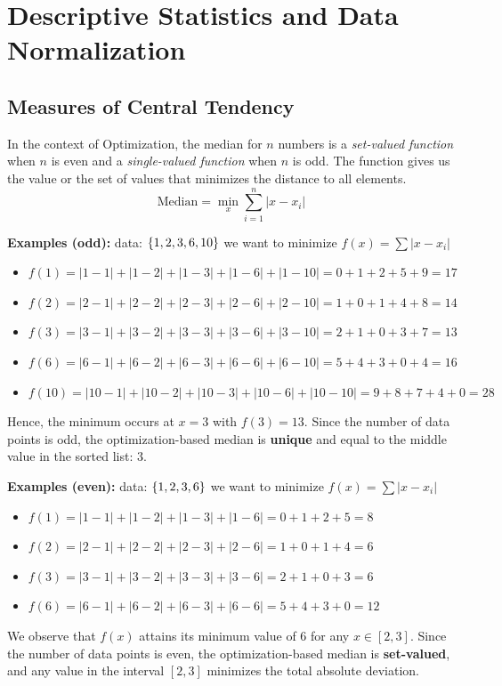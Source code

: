 \documentclass{article}
\begin{document}

\newpage
\section{Descriptive Statistics and Data Normalization}
\subsection*{Measures of Central Tendency}


In the context of Optimization, the median for $n$ numbers is a \textit{set-valued function} when $n$ is even and a \textit{single-valued function} when $n$ is odd. The function gives us the value or the set of values that minimizes the distance to all elements.
\[
\text{Median} = \displaystyle \min_{x} \sum_{i=1}^n | x-x_i |
\]

\textbf{Examples (odd):}
data: $\{1,2,3,6,10\}$
we want to minimize $f(x)= \sum | x - x_i |$
\begin{itemize}
    \item $f(1) = |1-1| + |1-2| + |1-3| + |1-6| + |1-10| = 0 + 1 + 2 + 5 + 9 = 17$
    \item $f(2) = |2-1| + |2-2| + |2-3| + |2-6| + |2-10| = 1 + 0 + 1 + 4 + 8 = 14$
    \item $f(3) = |3-1| + |3-2| + |3-3| + |3-6| + |3-10| = 2 + 1 + 0 + 3 + 7 = 13$
    \item $f(6) = |6-1| + |6-2| + |6-3| + |6-6| + |6-10| = 5 + 4 + 3 + 0 + 4 = 16$
    \item $f(10) = |10-1| + |10-2| + |10-3| + |10-6| + |10-10| = 9 + 8 + 7 + 4 + 0 = 28$
\end{itemize}
Hence, the minimum occurs at $x = 3$ with $f(3) = 13$. Since the number of data points is odd, the optimization-based median is \textbf{unique} and equal to the middle value in the sorted list: $\boxed{3}$.

\textbf{Examples (even):}
data: $\{1,2,3,6\}$
we want to minimize $f(x)= \sum | x - x_i |$
\begin{itemize}
    \item $f(1) = |1-1| + |1-2| + |1-3| + |1-6| = 0 + 1 + 2 + 5 = 8$
    \item $f(2) = |2-1| + |2-2| + |2-3| + |2-6| = 1 + 0 + 1 + 4 = 6$
    \item $f(3) = |3-1| + |3-2| + |3-3| + |3-6| = 2 + 1 + 0 + 3 = 6$
    \item $f(6) = |6-1| + |6-2| + |6-3| + |6-6| = 5 + 4 + 3 + 0 = 12$
\end{itemize}
We observe that $f(x)$ attains its minimum value of $6$ for any $x \in [2, 3]$. Since the number of data points is even, the optimization-based median is \textbf{set-valued}, and any value in the interval $\boxed{[2, 3]}$ minimizes the total absolute deviation.
\end{document}
